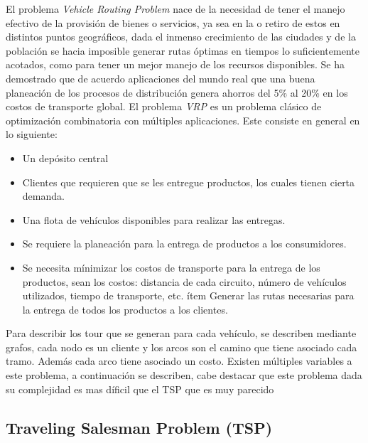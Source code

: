 \documentclass[letter, 10pt]{article}
\begin{document}
El problema \emph{Vehicle Routing Problem} nace de la necesidad de tener el manejo efectivo de la provisi\'on de bienes o servicios, ya sea en la
o retiro de estos en distintos puntos geogr\'aficos, dada el inmenso crecimiento de las ciudades y de la poblaci\'on se hacia imposible generar
rutas \'optimas en tiempos lo suficientemente acotados, como para tener un mejor manejo de los recursos disponibles. Se ha demostrado que de acuerdo
aplicaciones del mundo real que una buena planeaci\'on de los procesos de distribuci\'on genera ahorros del 5\% al 20\% en los costos de transporte
global.
\newline
El problema \emph{VRP} es un problema cl\'asico de optimizaci\'on combinatoria con m\'ultiples aplicaciones.
Este consiste en general en lo siguiente:
\begin{itemize}
 \item Un dep\'osito central
 \item Clientes que requieren que se les entregue productos, los cuales tienen cierta demanda.
 \item Una flota de veh\'iculos disponibles para realizar las entregas.
 \item Se requiere la planeaci\'on para la entrega de productos a los consumidores.
 \item Se necesita m\'inimizar los costos de transporte para la entrega de los productos, sean los costos: distancia de cada circuito, n\'umero de
 veh\'iculos utilizados, tiempo de transporte, etc.
 \'item Generar las rutas necesarias para la entrega de todos los productos a los clientes.
\end{itemize}

Para describir los tour que se generan para cada veh\'iculo, se describen mediante grafos, cada nodo es un cliente y los arcos son el camino que 
tiene asociado cada tramo. Adem\'as cada arco tiene asociado un costo.
\newline
Existen m\'ultiples variables a este problema, a continuaci\'on se describen, cabe destacar que este problema dada su complejidad es mas d\'ificil
que el TSP que es muy parecido


\subsection{Traveling Salesman Problem (TSP)}
\end{document}

